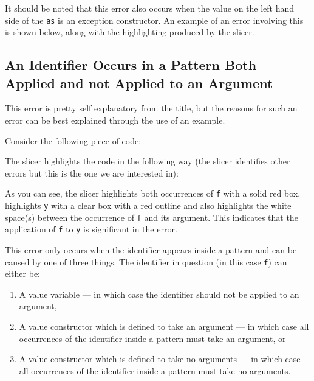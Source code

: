 \documentclass{report}
\begin{document}
\begin{itemize}
It should be noted that this error also occurs when the value on the
left hand side of the \texttt{as} is an exception constructor.
An example of an error involving this is shown below, along with the
highlighting produced by the slicer.



\newpage


\subsection{An Identifier Occurs in a Pattern Both Applied and not Applied
  to an Argument}

\subitem This error is pretty self explanatory from the title, but the
reasons for such an error can be best explained through the use of an
example.

Consider the following piece of code:


The slicer highlights the code in the following way (the slicer
identifies other errors but this is the one we are interested in):


As you can see, the slicer highlights both occurrences of
\texttt{f} with a solid red box, highlights
\texttt{y} with a clear box with a red outline and also
highlights the white space(s) between the occurrence of
\texttt{f} and its argument. This indicates
that the application of \texttt{f} to \texttt{y} is
significant in the error.

This error only occurs when the identifier appears inside a pattern
and can be caused by one of three things. The identifier in
question (in this case \texttt{f}) can either be:

\begin{enumerate}
\item A value variable --- in which case the identifier should not be
  applied to an argument,
\item A value constructor which is defined to take an argument --- in
  which case all occurrences of the identifier inside a pattern must take
  an argument, or
\item A value constructor which is defined to take no arguments --- in
  which case all occurrences of the identifier inside a pattern must take no arguments.
\end{enumerate}


\end{itemize}
\end{document}
